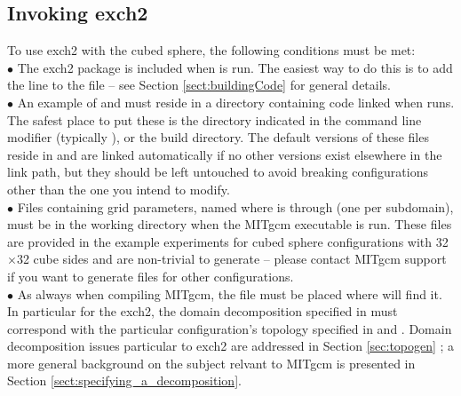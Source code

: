 \subsection{Invoking exch2}

To use exch2 with the cubed sphere, the following conditions must be
met: \\

$\bullet$ The exch2 package is included when  is run.
  The easiest way to do this is to add the line  to the
   file -- see Section
  \ref{sect:buildingCode} for general
  details. \\

$\bullet$ An example of  and
   must reside in a directory containing code
  linked when  runs.  The safest place to put these
  is the directory indicated in the  command line
  modifier (typically ), or the build directory.  The
  default versions of these files reside in  and are
  linked automatically if no other versions exist elsewhere in the
  link path, but they should be left untouched to avoid breaking
  configurations other than the one you intend to modify.\\

$\bullet$ Files containing grid parameters, named
   where  is  through
   (one per subdomain), must be in the working directory
  when the MITgcm executable is run.  These files are provided in the
  example experiments for cubed sphere configurations with
  32$\times$32 cube sides and are non-trivial to generate -- please
  contact MITgcm support if you want to generate files for other
  configurations. \\

$\bullet$ As always when compiling MITgcm, the file 
  must be placed where  will find it.  In particular
  for the exch2, the domain decomposition specified in 
  must correspond with the particular configuration's topology
  specified in  and
  .  Domain decomposition issues particular to
  exch2 are addressed in Section \ref{sec:topogen} ; a more general background on the subject
  relvant to MITgcm is presented in Section
  \ref{sect:specifying_a_decomposition}.\\

